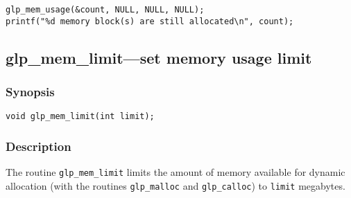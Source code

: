 \begin{footnotesize}
\begin{verbatim}
glp_mem_usage(&count, NULL, NULL, NULL);
printf("%d memory block(s) are still allocated\n", count);
\end{verbatim}
\end{footnotesize}

\subsection{glp\_mem\_limit---set memory usage limit}

\subsubsection*{Synopsis}

\begin{verbatim}
void glp_mem_limit(int limit);
\end{verbatim}

\subsubsection*{Description}

The routine \verb|glp_mem_limit| limits the amount of memory available
for dynamic allocation (with the routines \verb|glp_malloc| and
\verb|glp_calloc|) to \verb|limit| megabytes.


